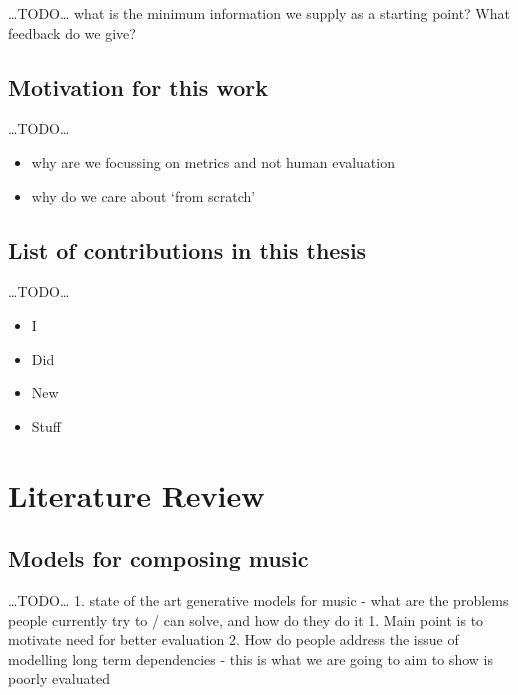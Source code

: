 \documentclass[12pt,a4paper,]{report}
\providecommand{\tightlist}{%
  \setlength{\itemsep}{0pt}\setlength{\parskip}{0pt}}
\begin{document}
\ldots TODO\ldots{} what is the minimum information we supply as a
starting point? What feedback do we give?

\hypertarget{motivation-for-this-work}{%
\section{Motivation for this work}\label{motivation-for-this-work}}

\ldots TODO\ldots{}

\begin{itemize}
\tightlist
\item
  why are we focussing on metrics and not human evaluation
\item
  why do we care about `from scratch'
\end{itemize}

\hypertarget{list-of-contributions-in-this-thesis}{%
\section{List of contributions in this
thesis}\label{list-of-contributions-in-this-thesis}}

\ldots TODO\ldots{}

\begin{itemize}
\tightlist
\item
  I
\item
  Did
\item
  New
\item
  Stuff
\end{itemize}

\hypertarget{literature-review}{%
\chapter{Literature Review}\label{literature-review}}

\hypertarget{models-for-composing-music}{%
\section{Models for composing music}\label{models-for-composing-music}}

\ldots TODO\ldots{} 1. state of the art generative models for music -
what are the problems people currently try to / can solve, and how do
they do it 1. Main point is to motivate need for better evaluation 2.
How do people address the issue of modelling long term dependencies -
this is what we are going to aim to show is poorly evaluated
\end{document}
